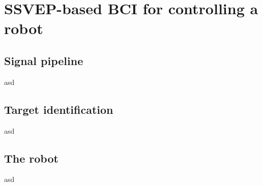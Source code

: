 
\chapter{SSVEP-based BCI for controlling a robot}
\label{SSVEP_BCI}
\section{Signal pipeline}
asd
\section{Target identification}
asd
\section{The robot}
asd